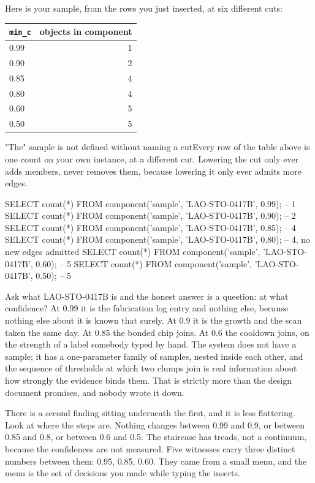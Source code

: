 Here is your sample, from the rows you just inserted, at six different cuts:

\begin{center}
\begin{tabular}{lr}
\toprule
\texttt{min\_c} & objects in component \\
\midrule
0.99 & 1 \\
0.90 & 2 \\
0.85 & 4 \\
0.80 & 4 \\
0.60 & 5 \\
0.50 & 5 \\
\bottomrule
\end{tabular}
\end{center}

\begin{Correspondence}{"The" sample is not defined without naming a cut}{Every row of the table above is one count on your own instance, at a different cut.}
Lowering the cut only ever adds members, never removes them, because lowering it only ever admits more edges.
\begin{Check}
SELECT count(*) FROM component('sample', 'LAO-STO-0417B', 0.99);   -- 1
SELECT count(*) FROM component('sample', 'LAO-STO-0417B', 0.90);   -- 2
SELECT count(*) FROM component('sample', 'LAO-STO-0417B', 0.85);   -- 4
SELECT count(*) FROM component('sample', 'LAO-STO-0417B', 0.80);   -- 4, no new edges admitted
SELECT count(*) FROM component('sample', 'LAO-STO-0417B', 0.60);   -- 5
SELECT count(*) FROM component('sample', 'LAO-STO-0417B', 0.50);   -- 5
\end{Check}
Ask what LAO-STO-0417B is and the honest answer is a question: at what confidence? At 0.99 it is the fabrication log entry and nothing else, because nothing else about it is known that surely. At 0.9 it is the growth and the scan taken the same day. At 0.85 the bonded chip joins. At 0.6 the cooldown joins, on the strength of a label somebody typed by hand. The system does not have a sample; it has a one-parameter family of samples, nested inside each other, and the sequence of thresholds at which two clumps join is real information about how strongly the evidence binds them. That is strictly more than the design document promises, and nobody wrote it down.
\end{Correspondence}

There is a second finding sitting underneath the first, and it is less flattering. Look at where the steps are. Nothing changes between 0.99 and 0.9, or between 0.85 and 0.8, or between 0.6 and 0.5. The staircase has treads, not a continuum, because the confidences are not measured. Five witnesses carry three distinct numbers between them: 0.95, 0.85, 0.60. They came from a small menu, and the menu is the set of decisions you made while typing the inserts.

